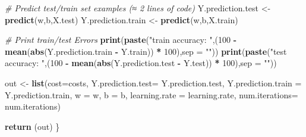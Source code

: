 \documentclass[]{article}
\newenvironment{Shaded}{\begin{snugshade}}{\end{snugshade}}
\newcommand{\KeywordTok}[1]{\textcolor[rgb]{0.13,0.29,0.53}{\textbf{#1}}}
\newcommand{\DataTypeTok}[1]{\textcolor[rgb]{0.13,0.29,0.53}{#1}}
\newcommand{\DecValTok}[1]{\textcolor[rgb]{0.00,0.00,0.81}{#1}}
\newcommand{\FloatTok}[1]{\textcolor[rgb]{0.00,0.00,0.81}{#1}}
\newcommand{\StringTok}[1]{\textcolor[rgb]{0.31,0.60,0.02}{#1}}
\newcommand{\CommentTok}[1]{\textcolor[rgb]{0.56,0.35,0.01}{\textit{#1}}}
\newcommand{\OperatorTok}[1]{\textcolor[rgb]{0.81,0.36,0.00}{\textbf{#1}}}
\newcommand{\NormalTok}[1]{#1}
\begin{document}
\begin{Shaded}
\begin{Highlighting}[]
    \CommentTok{# Predict test/train set examples (≈ 2 lines of code)}
\NormalTok{    Y.prediction.test <-}\StringTok{  }\KeywordTok{predict}\NormalTok{(w,b,X.test)}
\NormalTok{    Y.prediction.train <-}\StringTok{  }\KeywordTok{predict}\NormalTok{(w,b,X.train)}

    \CommentTok{# Print train/test Errors}
    \KeywordTok{print}\NormalTok{(}\KeywordTok{paste}\NormalTok{(}\StringTok{"train accuracy: "}\NormalTok{,(}\DecValTok{100} \OperatorTok{-}\StringTok{ }\KeywordTok{mean}\NormalTok{(}\KeywordTok{abs}\NormalTok{(Y.prediction.train }\OperatorTok{-}\StringTok{ }\NormalTok{Y.train)) }\OperatorTok{*}\StringTok{ }\DecValTok{100}\NormalTok{),}\DataTypeTok{sep =} \StringTok{""}\NormalTok{))}
    \KeywordTok{print}\NormalTok{(}\KeywordTok{paste}\NormalTok{(}\StringTok{"test accuracy:  "}\NormalTok{,(}\DecValTok{100} \OperatorTok{-}\StringTok{ }\KeywordTok{mean}\NormalTok{(}\KeywordTok{abs}\NormalTok{(Y.prediction.test }\OperatorTok{-}\StringTok{ }\NormalTok{Y.test)) }\OperatorTok{*}\StringTok{ }\DecValTok{100}\NormalTok{),}\DataTypeTok{sep =} \StringTok{""}\NormalTok{))}

    
\NormalTok{    out <-}\StringTok{  }\KeywordTok{list}\NormalTok{(}\DataTypeTok{cost=}\NormalTok{costs,}
         \DataTypeTok{Y.prediction.test=}\NormalTok{ Y.prediction.test, }
         \DataTypeTok{Y.prediction.train =}\NormalTok{ Y.prediction.train, }
         \DataTypeTok{w =}\NormalTok{ w, }\DataTypeTok{b =}\NormalTok{ b,}
         \DataTypeTok{learning.rate =}\NormalTok{ learning.rate,}
         \DataTypeTok{num.iterations=}\NormalTok{ num.iterations)}
    
    \KeywordTok{return}\NormalTok{ (out)}
\NormalTok{\}}
\end{Highlighting}
\end{Shaded}

\begin{Shaded}
\end{Shaded}
\end{document}
